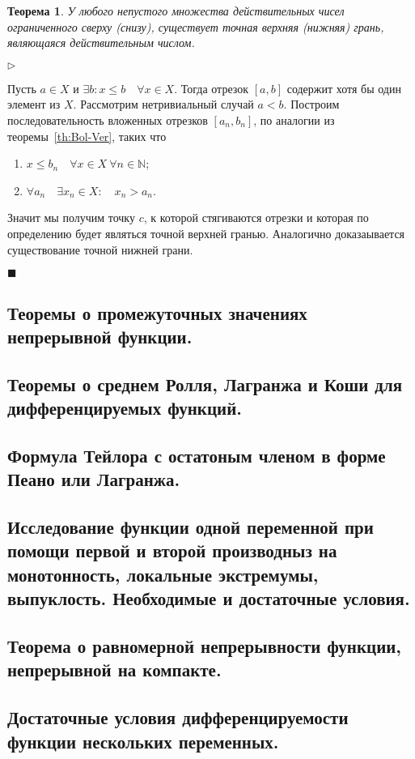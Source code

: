 \documentclass{urticle}
\newtheorem{theorem}{Теорема}
\theoremstyle{definition}
\newcommand{\prf}[1]{\hspace{0.3cm}$\triangleright$ \hspace{0.2cm} {#1} \hfill $\blacksquare$ }
\begin{document}
    \begin{theorem}
    \label{th:ExistSupInf}    
        У любого непустого множества действительных чисел ограниченного сверху (снизу), существует точная верхняя (нижняя) грань, являющаяся действительным числом. 
    \end{theorem}
    \prf{ Пусть $a \in X$ и $\exists b: x \leq b \quad \forall x \in X$. Тогда отрезок $[a, b]$ содержит хотя бы один элемент из $X$. Рассмотрим нетривиальный случай $a<b$. Построим последовательность вложенных отрезков $[a_n, b_n]$, по аналогии из теоремы~\ref{th:Bol-Ver}, таких что 
    \begin{enumerate}
    \item $x \leq b_n \quad \forall x \in X\: \forall n \in \mathbb{N}$;
    \item $\forall a_n \quad \exists x_n \in X: \quad x_n > a_n$.
    \end{enumerate}
    Значит мы получим точку $c$, к которой стягиваются отрезки и которая по определению будет являться точной верхней гранью. Аналогично доказаывается существование точной нижней грани. }

\subsection{Теоремы о промежуточных значениях непрерывной функции.}
\subsection{Теоремы о среднем Ролля, Лагранжа и Коши для дифференцируемых функций.}
\subsection{Формула Тейлора с остатоным членом в форме Пеано или Лагранжа.}
\subsection{Исследование функции одной переменной при помощи первой и второй производныз на монотонность, локальные экстремумы, выпуклость. Необходимые и достаточные условия.}
\subsection{Теорема о равномерной непрерывности функции, непрерывной на компакте.}
\subsection{Достаточные условия дифференцируемости функции нескольких переменных.}
\end{document}
